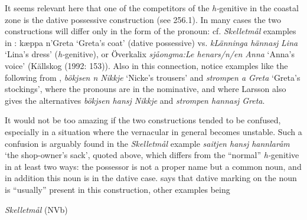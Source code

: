 \begin{styleBodytextC}
It seems relevant here that one of the competitors of the \textit{h-}genitive in the coastal zone is the dative possessive construction (see 256.1). In many cases the two constructions will differ only in the form of the pronoun: cf. \textit{Skelletmål} examples in \citet{Marklund1976}: kæppa n’Greta ‘Greta’s coat’ (dative possessive) vs. \textit{kLänninga hännasj} \textit{Lina} ‘Lina’s dress’ (\textit{h-}genitive), or Överkalix \textit{sjåongma:Le henars/n/en Anna} ‘Anna’s voice’ (Källskog (1992: 153)). Also in this connection, notice examples like the following from \citet[125]{Larsson1929}, \textit{bökjsen n Nikkje }‘Nicke’s trousers’ and \textit{strompen a Greta} ‘Greta’s stockings’, where the pronouns are in the nominative, and where Larsson also gives the alternatives \textit{bökjsen hansj Nikkje} and \textit{strompen hannasj Greta}.

\end{styleBodytextC}

\begin{styleBodytextC}
It would not be too amazing if the two constructions tended to be confused, especially in a situation where the vernacular in general becomes unstable. Such a confusion is arguably found in the \textit{Skelletmål} example \textit{saitjen hansj hannlaråm }‘the shop-owner’s sack’, quoted above, which differs from the “normal” \textit{h-}genitive in at least two ways: the possessor is not a proper name but a common noun, and in addition this noun is in the dative case. \citet[23]{Marklund1976} says that dative marking on the noun is “usually” present in this construction, other examples being 

\end{styleBodytextC}

\begin{listWWNumileveli}
\item 

\begin{styleExample}
\label{bkm:Ref136428236}\textit{Skelletmål} (NVb)

\end{styleExample}

\end{listWWNumileveli}

\begin{listWWNumlxxxiileveli}
\item 

\end{listWWNumlxxxiileveli}

